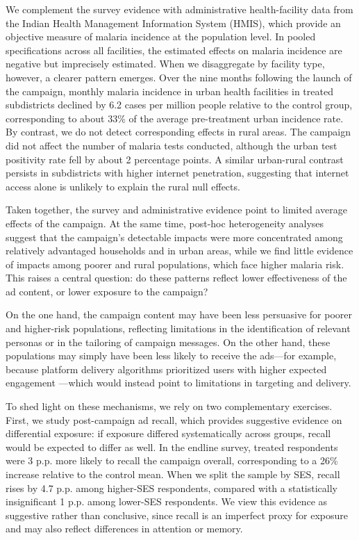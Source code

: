 We complement the survey evidence with administrative health-facility data from the Indian Health Management Information System (HMIS), which provide an objective measure of malaria incidence at the population level. In pooled specifications across all facilities, the estimated effects on malaria incidence are negative but imprecisely estimated. When we disaggregate by facility type, however, a clearer pattern emerges. Over the nine months following the launch of the campaign, monthly malaria incidence in urban health facilities in treated subdistricts declined by 6.2 cases per million people relative to the control group, corresponding to about 33\% of the average pre-treatment urban incidence rate. By contrast, we do not detect corresponding effects in rural areas. The campaign did not affect the number of malaria tests conducted, although the urban test positivity rate fell by about 2 percentage points. A similar urban-rural contrast persists in subdistricts with higher internet penetration, suggesting that internet access alone is unlikely to explain the rural null effects.

Taken together, the survey and administrative evidence point to limited average effects of the campaign. At the same time, post-hoc heterogeneity analyses suggest that the campaign’s detectable impacts were more concentrated among relatively advantaged households and in urban areas, while we find little evidence of impacts among poorer and rural populations, which face higher malaria risk. This raises a central question: do these patterns reflect lower effectiveness of the ad content, or lower exposure to the campaign?

On the one hand, the campaign content may have been less persuasive for poorer and higher-risk populations, reflecting limitations in the identification of relevant personas or in the tailoring of campaign messages. On the other hand, these populations may simply have been less likely to receive the ads---for example, because platform delivery algorithms prioritized users with higher expected engagement \citep{lambrecht2019algorithmic,sapiezynski2022algorithms}---which would instead point to limitations in targeting and delivery.

To shed light on these mechanisms, we rely on two complementary exercises. First, we study post-campaign ad recall, which provides suggestive evidence on differential exposure: if exposure differed systematically across groups, recall would be expected to differ as well. In the endline survey, treated respondents were 3 p.p. more likely to recall the campaign overall, corresponding to a 26\% increase relative to the control mean. When we split the sample by SES, recall rises by 4.7 p.p. among higher-SES respondents, compared with a statistically insignificant 1 p.p. among lower-SES respondents. We view this evidence as suggestive rather than conclusive, since recall is an imperfect proxy for exposure and may also reflect differences in attention or memory. 



